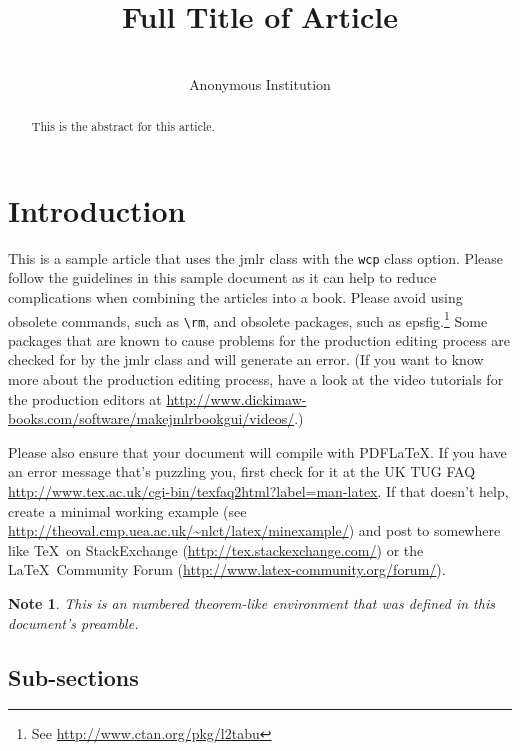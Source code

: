 \documentclass[tablecaption=bottom,wcp]{jmlr} %
\title[Short Title]{Full Title of Article}
\author{\Name{Anonymous Authors}\\
  \addr Anonymous Institution}
\newtheorem*{note}{Note}
\begin{document}
\maketitle

\begin{abstract}
  This is the abstract for this article.
\end{abstract}


\section{Introduction}
\label{sec:intro}

This is a sample article that uses the \textsf{jmlr} class with
the \texttt{wcp} class option.  Please follow the guidelines in
this sample document as it can help to reduce complications when
combining the articles into a book. Please avoid using obsolete
commands, such as \verb|\rm|, and obsolete packages, such as
\textsf{epsfig}.\footnote{See
  \url{http://www.ctan.org/pkg/l2tabu}} Some packages that are known
to cause problems for the production editing process are checked for
by the \textsf{jmlr} class and will generate an error. (If you want
to know more about the production editing process, have a look at
the video tutorials for the production editors at
\url{http://www.dickimaw-books.com/software/makejmlrbookgui/videos/}.)

Please also ensure that your document will compile with PDF\LaTeX.
If you have an error message that's puzzling you, first check for it
at the UK TUG FAQ
\url{http://www.tex.ac.uk/cgi-bin/texfaq2html?label=man-latex}.  If
that doesn't help, create a minimal working example (see
\url{http://theoval.cmp.uea.ac.uk/~nlct/latex/minexample/}) and post
to somewhere like \TeX\ on StackExchange
(\url{http://tex.stackexchange.com/}) or the \LaTeX\ Community Forum
(\url{http://www.latex-community.org/forum/}).

\begin{note}
  This is an numbered theorem-like environment that was defined in
  this document's preamble.
\end{note}

\subsection{Sub-sections}
\end{document}
